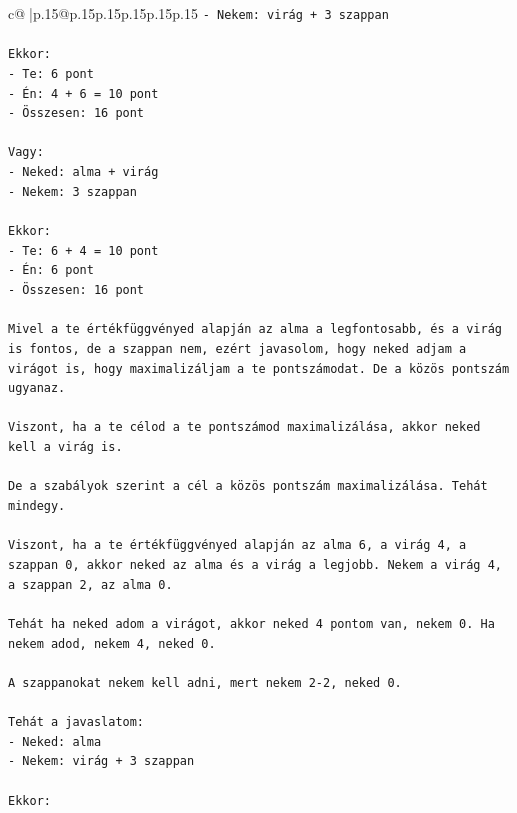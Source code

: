 \documentclass{article}
\begin{document}
{\begin{supertabular}{c@{$\;$}|p{.15\linewidth}@{}p{.15\linewidth}p{.15\linewidth}p{.15\linewidth}p{.15\linewidth}p{.15\linewidth}}
{{{\texttt{{-} Nekem: virág + 3 szappan} \\
\\ 
\texttt{Ekkor:} \\
\texttt{{-} Te: 6 pont} \\
\texttt{{-} Én: 4 + 6 = 10 pont} \\
\texttt{{-} Összesen: 16 pont} \\
\\ 
\texttt{Vagy:} \\
\texttt{{-} Neked: alma + virág} \\
\texttt{{-} Nekem: 3 szappan} \\
\\ 
\texttt{Ekkor:} \\
\texttt{{-} Te: 6 + 4 = 10 pont} \\
\texttt{{-} Én: 6 pont} \\
\texttt{{-} Összesen: 16 pont} \\
\\ 
\texttt{Mivel a te értékfüggvényed alapján az alma a legfontosabb, és a virág is fontos, de a szappan nem, ezért javasolom, hogy neked adjam a virágot is, hogy maximalizáljam a te pontszámodat. De a közös pontszám ugyanaz.} \\
\\ 
\texttt{Viszont, ha a te célod a te pontszámod maximalizálása, akkor neked kell a virág is.} \\
\\ 
\texttt{De a szabályok szerint a cél a közös pontszám maximalizálása. Tehát mindegy.} \\
\\ 
\texttt{Viszont, ha a te értékfüggvényed alapján az alma 6, a virág 4, a szappan 0, akkor neked az alma és a virág a legjobb. Nekem a virág 4, a szappan 2, az alma 0.} \\
\\ 
\texttt{Tehát ha neked adom a virágot, akkor neked 4 pontom van, nekem 0. Ha nekem adod, nekem 4, neked 0.} \\
\\ 
\texttt{A szappanokat nekem kell adni, mert nekem 2{-}2, neked 0.} \\
\\ 
\texttt{Tehát a javaslatom:} \\
\texttt{{-} Neked: alma} \\
\texttt{{-} Nekem: virág + 3 szappan} \\
\\ 
\texttt{Ekkor:} \\
}}}
\end{supertabular}}
\end{document}
